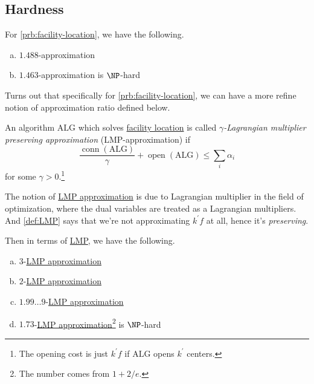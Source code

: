
\subsection{Hardness}
For \autoref{prb:facility-location}, we have the following.
\begin{enumerate}[(a)]
	\item \(1.488\)-approximation~\cite{LI201345}
	\item \(1.463\)-approximation is \(\NP\)-hard~\cite{GUHA1999228}
\end{enumerate}

Turns out that specifically for \autoref{prb:facility-location}, we can have a more refine notion of approximation ratio defined below.

\begin{definition}\label{def:LMP}
	An algorithm \(\mathrm{ALG}\) which solves \hyperref[prb:facility-location]{facility location} is called \emph{\(\gamma \)-Lagrangian multiplier preserving approximation} (LMP-approximation) if
	\[
		\frac{\mathop{\mathrm{conn}}(\mathrm{ALG})}{\gamma }+ \mathop{\mathrm{open}}(\mathrm{ALG}) \leq \sum_{i} \alpha _i
	\]
	for some \(\gamma > 0\).\footnote{The opening cost is just \(k^\prime f\) if \(\mathrm{ALG}\) opens \(k^\prime \) centers.}
\end{definition}
\begin{remark}
	The notion of \hyperref[def:LMP]{LMP approximation} is due to Lagrangian multiplier in the field of optimization, where the dual variables  are treated as a Lagrangian multipliers. And \autoref{def:LMP} says that we're not approximating \(k^\prime f\) at all, hence it's \emph{preserving}.
\end{remark}

Then in terms of \hyperref[def:LMP]{LMP}, we have the following.
\begin{enumerate}[(a)]
	\item \(3\)-\hyperref[def:LMP]{LMP approximation}~\cite{10.1145/375827.375845}
	\item \(2\)-\hyperref[def:LMP]{LMP approximation}~\cite{10.1145/509907.510012}
	\item \(1.99\ldots 9 \)-\hyperref[def:LMP]{LMP approximation}~\cite{https://doi.org/10.48550/arxiv.2207.05150}
	\item \(1.73\)-\hyperref[def:LMP]{LMP approximation}\footnote{The number comes from \(1 + 2 / e\).} is \(\NP\)-hard~\cite{10.1145/509907.510012}
\end{enumerate}

